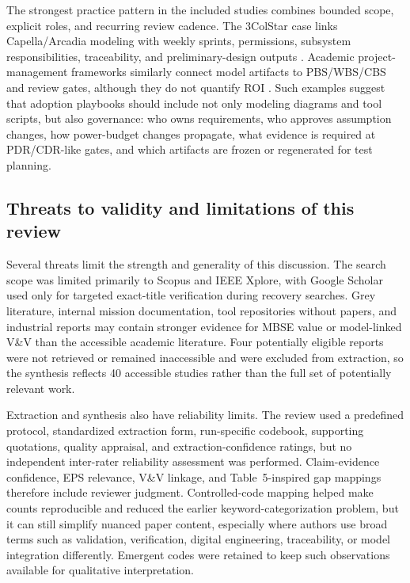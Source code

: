 The strongest practice pattern in the included studies combines bounded scope, explicit roles, and recurring review cadence.  The 3ColStar case links Capella/Arcadia modeling with weekly sprints, permissions, subsystem responsibilities, traceability, and preliminary-design outputs \cite{paper-0078}.  Academic project-management frameworks similarly connect model artifacts to PBS/WBS/CBS and review gates, although they do not quantify ROI \cite{paper-0023}.  Such examples suggest that adoption playbooks should include not only modeling diagrams and tool scripts, but also governance: who owns requirements, who approves assumption changes, how power-budget changes propagate, what evidence is required at PDR/CDR-like gates, and which artifacts are frozen or regenerated for test planning.

\subsection{Threats to validity and limitations of this review}
\label{sec:discussion-threats-limitations}

Several threats limit the strength and generality of this discussion.  The search scope was limited primarily to Scopus and IEEE Xplore, with Google Scholar used only for targeted exact-title verification during recovery searches.  Grey literature, internal mission documentation, tool repositories without papers, and industrial reports may contain stronger evidence for MBSE value or model-linked V\&V than the accessible academic literature.  Four potentially eligible reports were not retrieved or remained inaccessible and were excluded from extraction, so the synthesis reflects 40 accessible studies rather than the full set of potentially relevant work.

Extraction and synthesis also have reliability limits.  The review used a predefined protocol, standardized extraction form, run-specific codebook, supporting quotations, quality appraisal, and extraction-confidence ratings, but no independent inter-rater reliability assessment was performed.  Claim-evidence confidence, EPS relevance, V\&V linkage, and Table~5-inspired gap mappings therefore include reviewer judgment.  Controlled-code mapping helped make counts reproducible and reduced the earlier keyword-categorization problem, but it can still simplify nuanced paper content, especially where authors use broad terms such as validation, verification, digital engineering, traceability, or model integration differently.  Emergent codes were retained to keep such observations available for qualitative interpretation.

